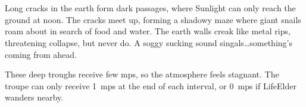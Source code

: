 \section{}
\label{shadepaths}

Long cracks in the earth form dark passages, where Sunlight can only reach the ground at noon.
The cracks meet up, forming a shadowy maze where giant snails roam about in search of food and water.
The earth walls creak like metal rips, threatening collapse, but never do.
A soggy sucking sound singals\ldots something's coming from ahead.


These deep troughs receive few \glspl{mp}, so the atmosphere feels stagnant.
The troupe can only receive 1~\glspl{mp} at the end of each \gls{interval}, or 0~\glspl{mp} if \gls{LifeElder} wanders nearby.




